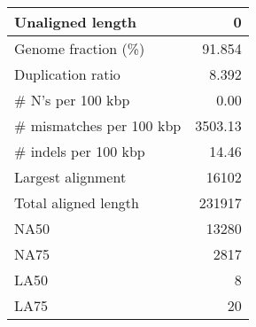 \documentclass[12pt,a4paper]{article}
\begin{document}
\begin{table}[ht]
\begin{center}
\begin{tabular}{|l*{1}{|r}|}
Unaligned length & 0 \\ \hline
Genome fraction (\%) & 91.854 \\ \hline
Duplication ratio & 8.392 \\ \hline
\# N's per 100 kbp & 0.00 \\ \hline
\# mismatches per 100 kbp & 3503.13 \\ \hline
\# indels per 100 kbp & 14.46 \\ \hline
Largest alignment & 16102 \\ \hline
Total aligned length & 231917 \\ \hline
NA50 & 13280 \\ \hline
NA75 & 2817 \\ \hline
LA50 & 8 \\ \hline
LA75 & 20 \\ \hline
\end{tabular}
\end{center}
\end{table}
\end{document}

